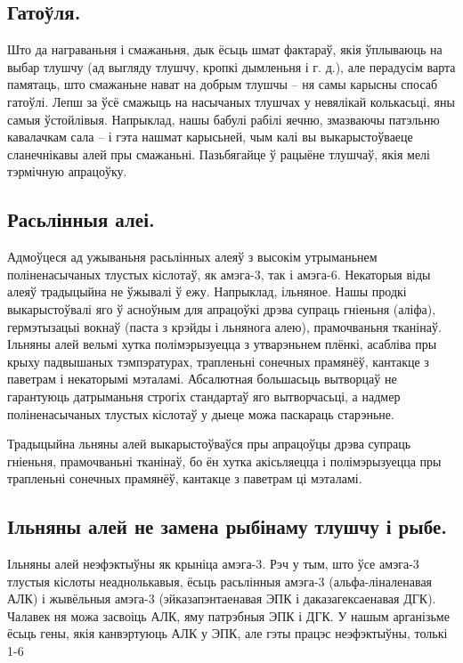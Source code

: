 \subsection{Гатоўля.}
Што да награваньня і смажаньня, дык ёсьць шмат фактараў, якія ўплываюць на выбар тлушчу (ад выгляду тлушчу, кропкі дымленьня і г. д.), але перадусім варта памятаць, што смажаньне нават на добрым тлушчы – ня самы карысны спосаб гатоўлі. Лепш за ўсё смажыць на насычаных тлушчах у невялікай колькасьці, яны самыя ўстойлівыя. Напрыклад, нашы бабулі рабілі яечню, змазваючы патэльню кавалачкам сала – і гэта нашмат карысьней, чым калі вы выкарыстоўваеце сланечнікавы алей пры смажаньні. Пазьбягайце ў рацыёне тлушчаў, якія мелі тэрмічную апрацоўку.

\subsection{Расьлінныя алеі.}
Адмоўцеся ад ужываньня расьлінных алеяў з высокім утрыманьнем поліненасычаных тлустых кіслотаў, як амэга-3, так і амэга-6. Некаторыя віды алеяў традыцыйна не ўжывалі ў ежу. Напрыклад, ільняное. Нашы продкі выкарыстоўвалі яго ў асноўным для апрацоўкі дрэва супраць гніеньня (аліфа), гермэтызацыі вокнаў (паста з крэйды і льнянога алею), прамочваньня тканінаў. Ільняны алей вельмі хутка полімэрызуецца з утварэньнем плёнкі, асабліва пры крыху падвышаных тэмпэратурах, трапленьні сонечных прамянёў, кантакце з паветрам і некаторымі мэталамі. Абсалютная большасьць вытворцаў не гарантуюць датрыманьня строгіх стандартаў яго вытворчасьці, а надмер поліненасычаных тлустых кіслотаў у дыеце можа паскараць старэньне.

Традыцыйна льняны алей выкарыстоўваўся пры апрацоўцы дрэва супраць гніеньня, прамочваньні тканінаў, бо ён хутка акісьляецца і полімэрызуецца пры трапленьні сонечных прамянёў, кантакце з паветрам ці мэталамі.

\subsection{Ільняны алей не замена рыбінаму тлушчу і рыбе.}
Ільняны алей неэфэктыўны як крыніца амэга-3. Рэч у тым, што ўсе амэга-3 тлустыя кіслоты неаднолькавыя, ёсьць расьлінныя амэга-3 (альфа-ліналенавая АЛК) і жывёльныя амэга-3 (эйказапэнтаенавая ЭПК і даказагексаенавая ДГК). Чалавек ня можа засвоіць АЛК, яму патрэбныя ЭПК і ДГК. У нашым арганізьме ёсьць гены, якія канвэртуюць АЛК у ЭПК, але гэты працэс неэфэктыўны, толькі 1-6%

